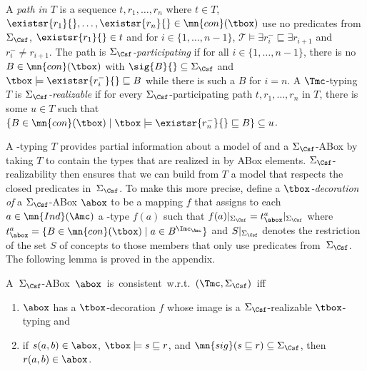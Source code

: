 \documentclass{lmcs}
\theoremstyle{definition}
\begin{document}
A \emph{path in
  $T$} is a sequence $t,r_1,\ldots,r_n$ where $t \in T$,
$\existsr{r_1}{},\dots,\existsr{r_{n}}{} \in \mn{con}(\tbox)$ use no
predicates from $\Sigma_{\Csf}$, $\existsr{r_1}{}\in t$ and for
$i\in\{1,\ldots,n-1\}$, $\mathcal{T} \models \exists r_i^- \sqsubseteq
\exists r_{i+1}$ and \mbox{$r_i^- \ne r_{i+1}$}. The path is
\emph{$\Sigma_{\Csf}$-participating} if for all $i \in \{1,\dots,n-1\}$,
there is no $B\in \mn{con}(\tbox)$ with $\sig{B}{}\subseteq\Sigma_{\Csf}$ and
$\tbox\models\existsr{r_i^-}{}\sqsubseteq B$ while there is such a $B$
for $i=n$.  A $\Tmc$-typing $T$ is \emph{$\Sigma_{\Csf}$-realizable} if for
every $\Sigma_{\Csf}$-participating path $t,r_1,\ldots,r_n$ in $T$, there is
some $u\in T$ such that $\{B\in \mn{con}(\tbox)\mid
\tbox\models\existsr{r^-_n}{}\sqsubseteq B\}\subseteq u$.

A \Tmc-typing $T$ provides partial information about a model \Imc of
\Tmc and a $\Sigma_{\Csf}$-ABox \Amc by taking $T$ to contain the
types that are realized in \Imc by ABox
elements. $\Sigma_{\Csf}$-realizability then ensures that we can build
from $T$ a model that respects the closed predicates
in~$\Sigma_{\Csf}$. To make this more precise, define a
\emph{$\tbox$-decoration of} a $\Sigma_{\Csf}$-ABox $\abox$ to be a
mapping $f$ that assigns to each $a\in \mn{Ind}(\Amc)$ a \Tmc-type
$f(a)$ such that $f(a)|_{\Sigma_{\Csf}} = t^a_\abox|_{\Sigma_{\Csf}}$
where $t^a_\abox=\{B\in \mn{con}(\tbox)\mid a \in B^{\Imc_\Amc}\}$ and
$S|_{\Sigma_{\Csf}}$ denotes the restriction of the set $S$ of
concepts to those members that only use predicates
from~$\Sigma_{\Csf}$.
%
%
The following lemma is proved in the appendix.
\begin{lem}
  \label{lem:deco}
  \mbox{A $\Sigma_{\Csf}$-ABox $\abox$ is consistent w.r.t.~$(\Tmc,\Sigma_{\Csf})$ iff}
  \begin{enumerate}
  \item $\abox$ has a $\tbox$-decoration $f$ whose image is a
    $\Sigma_{\Csf}$-realizable $\tbox$-typing and
  \item if $s(a,b)\in\abox$, $\tbox\models s\sqsubseteq r$, and $\mn{sig}(s\sqsubseteq r)\subseteq\Sigma_{\Csf}$,
     then $r(a,b)\in\abox$.
  \end{enumerate}
\end{lem}
\end{document}
